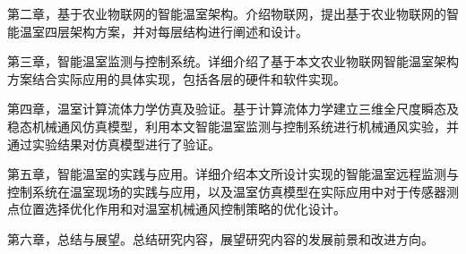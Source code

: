 	第二章，基于农业物联网的智能温室架构。介绍物联网，提出基于农业物联网的智能温室四层架构方案，并对每层结构进行阐述和设计。
	
	第三章，智能温室监测与控制系统。详细介绍了基于本文农业物联网智能温室架构方案结合实际应用的具体实现，包括各层的硬件和软件实现。
	
	第四章，温室计算流体力学仿真及验证。基于计算流体力学建立三维全尺度瞬态及稳态机械通风仿真模型，利用本文智能温室监测与控制系统进行机械通风实验，并通过实验结果对仿真模型进行了验证。
	
	第五章，智能温室的实践与应用。详细介绍本文所设计实现的智能温室远程监测与控制系统在温室现场的实践与应用，以及温室仿真模型在实际应用中对于传感器测点位置选择优化作用和对温室机械通风控制策略的优化设计。
	
	第六章，总结与展望。总结研究内容，展望研究内容的发展前景和改进方向。